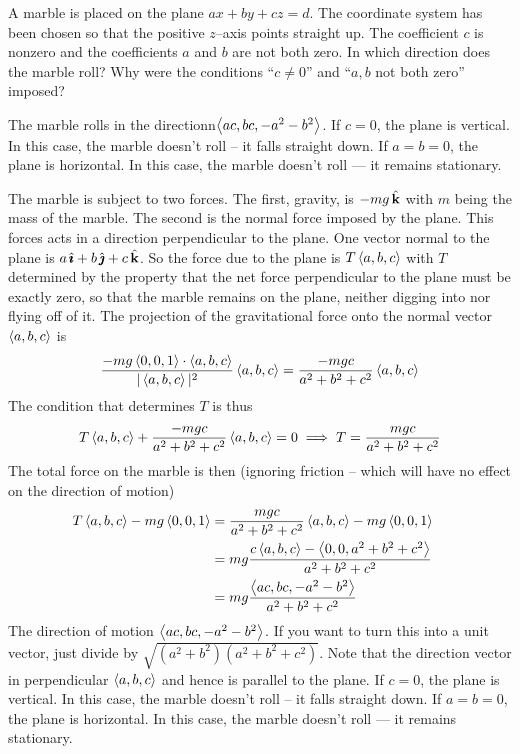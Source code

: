 \begin{question}
A marble is placed on the plane $ax+by+cz=d$. The coordinate
system has been chosen so that the positive $z$--axis points straight up.
The coefficient $c$ is nonzero and the coefficients $a$ and $b$ are not
both zero.
In which direction does the marble roll? 
Why were the conditions ``$c\ne 0$'' and ``$a,b$ not both zero'' imposed?
\end{question}


\begin{answer}
The marble rolls in the directionn$\left< ac,bc,-a^2-b^2\right>$.
If $c=0$, the plane is vertical. In this case, the marble
doesn't roll -- it falls straight down. If $a=b=0$, the plane is horizontal.
 In this case, the marble doesn't roll --- it remains stationary.
\end{answer}

\begin{solution}
The marble is subject to two forces. The first, gravity, is
$-mg\,\hat{\mathbf{k}}$ with $m$ being the mass of the marble. The second is the normal
force imposed by the plane. This forces acts in a direction perpendicular
to the plane. One vector normal to the plane is $a\,\hat{\pmb{\imath}}+b\,\hat{\pmb{\jmath}}+c\,\hat{\mathbf{k}}$. 
So the force due to the plane is $T\left< a,b,c\right>$ with $T$ determined  by the
property that the net force perpendicular to the plane must be exactly
zero, so that the marble remains on the plane, neither digging into nor
flying off of it. The projection of the gravitational force onto the normal
vector $\left< a,b,c\right>$ is
\begin{equation*}
\frac{-mg\left< 0,0,1\right>\cdot\left< a,b,c\right>}{|\left< a,b,c\right>|^2}\left< a,b,c\right>
=\frac{-mgc}{a^2+b^2+c^2}\left< a,b,c\right>
\end{equation*}
The condition that determines $T$ is thus
\begin{equation*}
T\left< a,b,c\right>+\frac{-mgc}{a^2+b^2+c^2}\left< a,b,c\right> =0
\implies T=\frac{mgc}{a^2+b^2+c^2}
\end{equation*}
The total force on the marble is then (ignoring friction -- which will
have no effect on the direction of motion)
\begin{align*}
T\left< a,b,c\right>-mg\left< 0,0,1\right>&=\frac{mgc}{a^2+b^2+c^2}\left< a,b,c\right>-mg\left< 0,0,1\right>\cr
&=mg\frac{c\left< a,b,c\right>-\left< 0,0,a^2+b^2+c^2\right>}{a^2+b^2+c^2}\cr
&=mg\frac{\left< ac,bc,-a^2-b^2\right>}{a^2+b^2+c^2}\cr
\end{align*}
The direction of motion $\left< ac,bc,-a^2-b^2\right>$. If you want to turn
this into a unit vector, just divide by $\sqrt{(a^2+b^2)(a^2+b^2+c^2)}$.
Note that the direction vector in perpendicular $\left< a,b,c\right>$ and hence is parallel
to the plane. If $c=0$, the plane is vertical. In this case, the marble
doesn't roll -- it falls straight down. If $a=b=0$, the plane is horizontal.
 In this case, the marble doesn't roll --- it remains stationary.
\end{solution}

